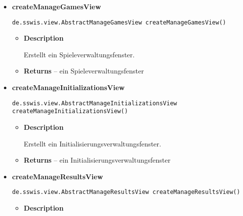 {{{{\begin{itemize}
{\begin{itemize}
{Erstellt ein Konfigurationsverwaltungsfenster.
}
\item{{\bf  Returns} -- 
ein Konfigurationsverwaltungsfenster 
}%
\end{itemize}
}%
\item{ 
\hypertarget{de.sswis.controller.AbstractGuiFactory.createManageGamesView()}{{\bf  createManageGamesView}\\}
\begin{lstlisting}[frame=none]
de.sswis.view.AbstractManageGamesView createManageGamesView()\end{lstlisting} %
\begin{itemize}
\item{
{\bf  Description}

Erstellt ein Spieleverwaltungsfenster.
}
\item{{\bf  Returns} -- 
ein Spieleverwaltungsfenster 
}%
\end{itemize}
}%
\item{ 
\hypertarget{de.sswis.controller.AbstractGuiFactory.createManageInitializationsView()}{{\bf  createManageInitializationsView}\\}
\begin{lstlisting}[frame=none]
de.sswis.view.AbstractManageInitializationsView createManageInitializationsView()\end{lstlisting} %
\begin{itemize}
\item{
{\bf  Description}

Erstellt ein Initialisierungsverwaltungsfenster.
}
\item{{\bf  Returns} -- 
ein Initialisierungsverwaltungsfenster 
}%
\end{itemize}
}%
\item{ 
\hypertarget{de.sswis.controller.AbstractGuiFactory.createManageResultsView()}{{\bf  createManageResultsView}\\}
\begin{lstlisting}[frame=none]
de.sswis.view.AbstractManageResultsView createManageResultsView()\end{lstlisting} %
\begin{itemize}
\item{
{\bf  Description}

}
\end{itemize}}
\end{itemize}}}}}

